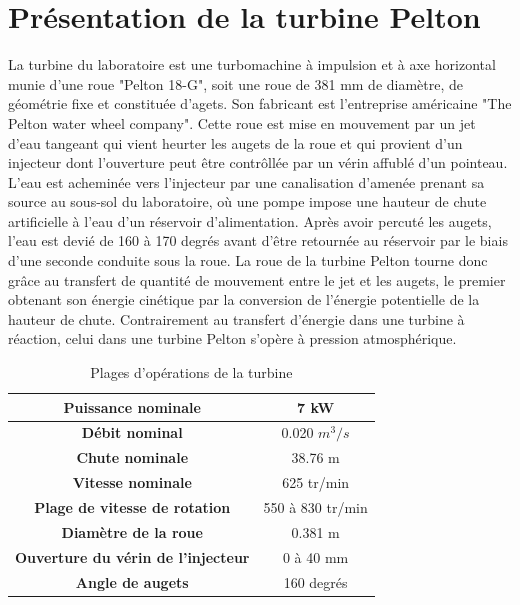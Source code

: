 \section{Présentation de la turbine Pelton}
La turbine du laboratoire est une turbomachine à impulsion et à axe horizontal munie d'une roue "Pelton 18-G", soit une roue de 381 mm de diamètre, de géométrie fixe et constituée d'agets.
Son fabricant est l'entreprise américaine "The Pelton water wheel company".
Cette roue est mise en mouvement par un jet d'eau tangeant  qui vient heurter les augets de la roue et qui provient d'un injecteur dont l'ouverture peut être contrôllée par un vérin affublé d'un pointeau. L'eau est acheminée vers l'injecteur par une canalisation d'amenée prenant sa source au sous-sol du laboratoire, où une pompe impose une hauteur de chute artificielle à l'eau d'un réservoir d'alimentation.
Après avoir percuté les augets, l'eau est devié de 160 à 170 degrés avant d'être retournée au réservoir par le biais d'une seconde conduite sous la roue. 
La roue de la turbine Pelton tourne donc grâce au transfert de quantité de mouvement entre le jet et les augets, le premier obtenant son énergie cinétique par la conversion de l'énergie potentielle de la hauteur de chute.
Contrairement au transfert d'énergie dans une turbine à réaction, celui dans une turbine Pelton s'opère à pression atmosphérique.  

\begin{table}[H]
\centering
\caption{Plages d'opérations de la turbine}
    \label{tab:Op_table}
    \begin{tabular}{|c|c|}
        \hline
	\textbf{Puissance nominale} & 7 kW \\
        \hline
	\textbf{Débit nominal} & 0.020 $m^3/s$ \\
        \hline
	\textbf{Chute nominale} & 38.76 m \\
        \hline
	\textbf{Vitesse nominale} & 625 tr/min \\
        \hline
	\textbf{Plage de vitesse de rotation} & 550 à 830 tr/min \\
        \hline
	\textbf{Diamètre de la roue} & 0.381 m \\
        \hline
	\textbf{Ouverture du vérin de l'injecteur} & 0 à 40 mm \\
        \hline
	\textbf{Angle de augets} & 160 degrés \\
        \hline
   \end{tabular}
\end{table}	
